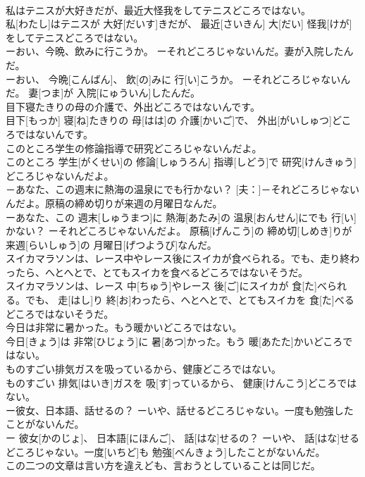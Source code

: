 \documentclass[8pt]{extreport}
\begin{document}
\begin{CJK}{UTF8}{min}
\\	私はテニスが大好きだが、最近大怪我をしてテニスどころではない。	
\\	私[わたし]はテニスが 大好[だいす]きだが、 最近[さいきん] 大[だい] 怪我[けが]をしてテニスどころではない。
\\	ーおい、今晩、飲みに行こうか。 ーそれどころじゃないんだ。妻が入院したんだ。	
\\	ーおい、 今晩[こんばん]、 飲[の]みに 行[い]こうか。 ーそれどころじゃないんだ。 妻[つま]が 入院[にゅういん]したんだ。
\\	目下寝たきりの母の介護で、外出どころではないんです。	
\\	目下[もっか] 寝[ね]たきりの 母[はは]の 介護[かいご]で、 外出[がいしゅつ]どころではないんです。
\\	このところ学生の修論指導で研究どころじゃないんだよ。	
\\	このところ 学生[がくせい]の 修論[しゅうろん] 指導[しどう]で 研究[けんきゅう]どころじゃないんだよ。
\\	[妻：]－あなた、この週末に熱海の温泉にでも行かない？ [夫：]－それどころじゃないんだよ。原稿の締め切りが来週の月曜日なんだ。	
\\	ーあなた、この 週末[しゅうまつ]に 熱海[あたみ]の 温泉[おんせん]にでも 行[い]かない？ ーそれどころじゃないんだよ。 原稿[げんこう]の 締め切[しめき]りが 来週[らいしゅう]の 月曜日[げつようび]なんだ。
\\	スイカマラソンは、レース中やレース後にスイカが食べられる。でも、走り終わったら、へとへとで、とてもスイカを食べるどころではないそうだ。	
\\	スイカマラソンは、レース 中[ちゅう]やレース 後[ご]にスイカが 食[た]べられる。でも、 走[はし]り 終[お]わったら、へとへとで、とてもスイカを 食[た]べるどころではないそうだ。
\\	今日は非常に暑かった。もう暖かいどころではない。	
\\	今日[きょう]は 非常[ひじょう]に 暑[あつ]かった。もう 暖[あたた]かいどころではない。
\\	ものすごい排気ガスを吸っているから、健康どころではない。	
\\	ものすごい 排気[はいき]ガスを 吸[す]っているから、 健康[けんこう]どころではない。
\\	ー彼女、日本語、話せるの？ ーいや、話せるどころじゃない。一度も勉強したことがないんだ。	
\\	ー 彼女[かのじょ]、 日本語[にほんご]、 話[はな]せるの？ ーいや、 話[はな]せるどころじゃない。一度[いちど]も 勉強[べんきょう]したことがないんだ。
\\	この二つの文章は言い方を違えども、言おうとしていることは同じだ。	

\end{CJK}
\end{document}
